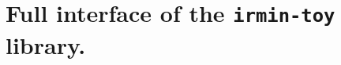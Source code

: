 \section{Full interface of the \texttt{irmin-toy} library.}
\label{app:irmin-interface}

\inputminted{ocaml}{appendices/sources/s.ml}